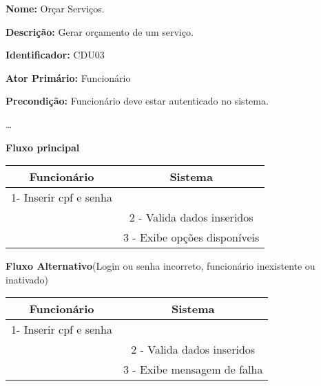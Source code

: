 	\par
	\textbf{Nome:} Orçar Serviços.
	\par
	\textbf{Descrição:} Gerar orçamento de um serviço. 
	\par 
	\textbf{Identificador:} CDU03
	\par
	\textbf{Ator Primário:} Funcionário	
	\par
	\textbf{Precondição:} Funcionário deve estar autenticado no sistema.
	\par	
	\ldots
	\par
	\textbf{Fluxo principal}\par
	\begin{tabular}{|c|c|}
		\hline 
		Funcionário & Sistema \\ 
		\hline 
		1- Inserir cpf e senha  &  \\ 
		\hline 
		& 
		
		2 - Valida dados inseridos 
		\\ 
		\hline 
		& 
		
		3 - Exibe opções disponíveis
		\\ 
		\hline 
	\end{tabular} 
	\vspace{12px}
	\par
	\textbf{Fluxo Alternativo}(Login ou senha incorreto, funcionário inexistente ou inativado)\par
	\begin{tabular}{|c|c|}
		\hline 
		Funcionário & Sistema \\ 
		\hline 
		1- Inserir cpf e senha  &  \\ 
		\hline 
		& 
		
		2 - Valida dados inseridos 
		\\ 
		\hline 
		& 
		
		3 - Exibe mensagem de falha		
		\\ 
		\hline 
	\end{tabular} 
	\vspace{12px}

